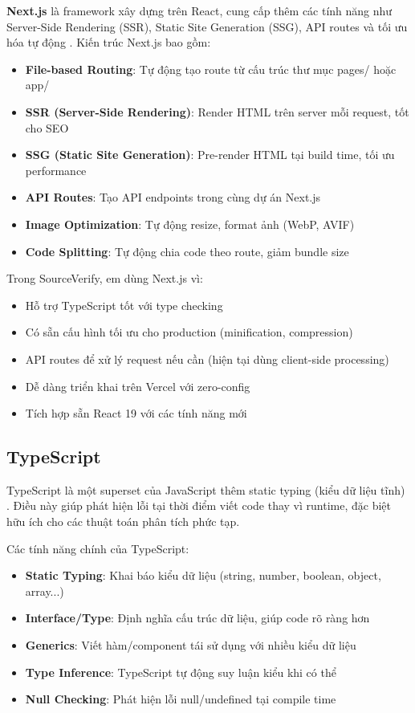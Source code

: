 \textbf{Next.js} là framework xây dựng trên React, cung cấp thêm các tính năng như Server-Side Rendering (SSR), Static Site Generation (SSG), API routes và tối ưu hóa tự động \cite{nextjs}. Kiến trúc Next.js bao gồm:

\begin{itemize}
  \item \textbf{File-based Routing}: Tự động tạo route từ cấu trúc thư mục pages/ hoặc app/
  \item \textbf{SSR (Server-Side Rendering)}: Render HTML trên server mỗi request, tốt cho SEO
  \item \textbf{SSG (Static Site Generation)}: Pre-render HTML tại build time, tối ưu performance
  \item \textbf{API Routes}: Tạo API endpoints trong cùng dự án Next.js
  \item \textbf{Image Optimization}: Tự động resize, format ảnh (WebP, AVIF)
  \item \textbf{Code Splitting}: Tự động chia code theo route, giảm bundle size
\end{itemize}

Trong SourceVerify, em dùng Next.js vì:
\begin{itemize}
  \item Hỗ trợ TypeScript tốt với type checking
  \item Có sẵn cấu hình tối ưu cho production (minification, compression)
  \item API routes để xử lý request nếu cần (hiện tại dùng client-side processing)
  \item Dễ dàng triển khai trên Vercel với zero-config
  \item Tích hợp sẵn React 19 với các tính năng mới
\end{itemize}

\subsection{TypeScript}
TypeScript là một superset của JavaScript thêm static typing (kiểu dữ liệu tĩnh) \cite{typescript}. Điều này giúp phát hiện lỗi tại thời điểm viết code thay vì runtime, đặc biệt hữu ích cho các thuật toán phân tích phức tạp.

Các tính năng chính của TypeScript:
\begin{itemize}
  \item \textbf{Static Typing}: Khai báo kiểu dữ liệu (string, number, boolean, object, array...)
  \item \textbf{Interface/Type}: Định nghĩa cấu trúc dữ liệu, giúp code rõ ràng hơn
  \item \textbf{Generics}: Viết hàm/component tái sử dụng với nhiều kiểu dữ liệu
  \item \textbf{Type Inference}: TypeScript tự động suy luận kiểu khi có thể
  \item \textbf{Null Checking}: Phát hiện lỗi null/undefined tại compile time
\end{itemize}

